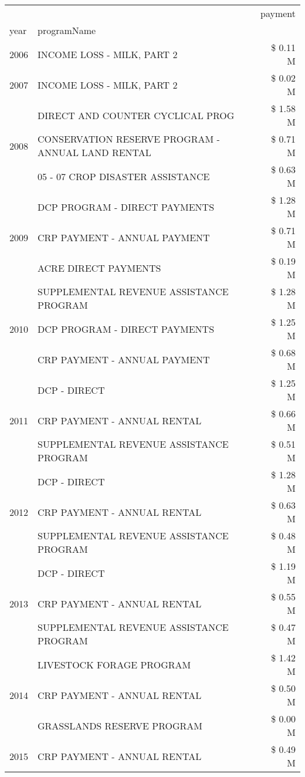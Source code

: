 \begin{tabular}{llr}
\toprule
 &  & payment \\
year & programName &  \\
\midrule
2006 & INCOME LOSS - MILK, PART 2 & \$ 0.11 M \\
\cline{1-3}
2007 & INCOME LOSS - MILK, PART 2 & \$ 0.02 M \\
\cline{1-3}
\multirow[t]{3}{*}{2008} & DIRECT AND COUNTER CYCLICAL PROG & \$ 1.58 M \\
 & CONSERVATION RESERVE PROGRAM - ANNUAL LAND RENTAL & \$ 0.71 M \\
 & 05 - 07 CROP DISASTER ASSISTANCE & \$ 0.63 M \\
\cline{1-3}
\multirow[t]{3}{*}{2009} & DCP PROGRAM - DIRECT PAYMENTS & \$ 1.28 M \\
 & CRP PAYMENT - ANNUAL PAYMENT & \$ 0.71 M \\
 & ACRE DIRECT PAYMENTS & \$ 0.19 M \\
\cline{1-3}
\multirow[t]{3}{*}{2010} & SUPPLEMENTAL REVENUE ASSISTANCE PROGRAM & \$ 1.28 M \\
 & DCP PROGRAM - DIRECT PAYMENTS & \$ 1.25 M \\
 & CRP PAYMENT - ANNUAL PAYMENT & \$ 0.68 M \\
\cline{1-3}
\multirow[t]{3}{*}{2011} & DCP - DIRECT & \$ 1.25 M \\
 & CRP PAYMENT - ANNUAL RENTAL & \$ 0.66 M \\
 & SUPPLEMENTAL REVENUE ASSISTANCE PROGRAM & \$ 0.51 M \\
\cline{1-3}
\multirow[t]{3}{*}{2012} & DCP - DIRECT & \$ 1.28 M \\
 & CRP PAYMENT - ANNUAL RENTAL & \$ 0.63 M \\
 & SUPPLEMENTAL REVENUE ASSISTANCE PROGRAM & \$ 0.48 M \\
\cline{1-3}
\multirow[t]{3}{*}{2013} & DCP - DIRECT & \$ 1.19 M \\
 & CRP PAYMENT - ANNUAL RENTAL & \$ 0.55 M \\
 & SUPPLEMENTAL REVENUE ASSISTANCE PROGRAM & \$ 0.47 M \\
\cline{1-3}
\multirow[t]{3}{*}{2014} & LIVESTOCK FORAGE PROGRAM & \$ 1.42 M \\
 & CRP PAYMENT - ANNUAL RENTAL & \$ 0.50 M \\
 & GRASSLANDS RESERVE PROGRAM & \$ 0.00 M \\
\cline{1-3}
\multirow[t]{3}{*}{2015} & CRP PAYMENT - ANNUAL RENTAL & \$ 0.49 M \\

\end{tabular}
